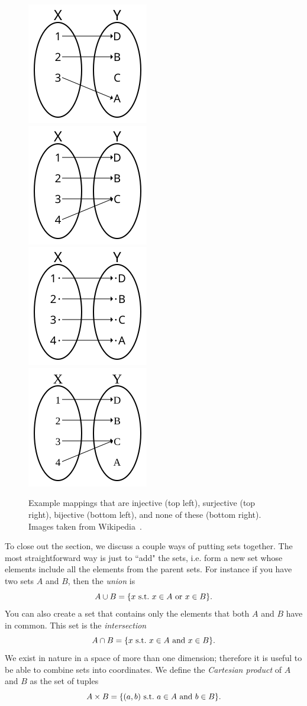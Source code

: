 \begin{figure}
\centering
\includegraphics[width=0.25\linewidth]{figs/Injection.png}~~~
\includegraphics[width=0.25\linewidth]{figs/Surjection.png}\\
\includegraphics[width=0.25\linewidth]{figs/Bijection.png}~~~
\includegraphics[width=0.25\linewidth]{figs/Not-Injection-Surjection.png}
\caption{Example mappings that are injective (top left), surjective (top right),
bijective (bottom left), and none of these (bottom right). Images taken from
Wikipedia~\cite{wiki:bijection}.}
\label{fig:mapping}
\end{figure}


To close out the section, we discuss a couple ways of putting sets together.
The most straightforward way is just to ``add" the sets, i.e. form a new set
whose elements include all the elements from the parent sets. For instance if
you have two sets $A$ and $B$, then the {\it union} is
\begin{equation}
A\cup B = \{x~\text{s.t.}~ x\in A~\text{or}~x\in B\}.
\end{equation}
You can also create a set that contains only the elements that both $A$ and $B$ have
in common. This set is the {\it intersection}
\begin{equation}
A\cap B = \{x~\text{s.t.}~ x\in A~\text{and}~x\in B\}.
\end{equation}
We exist in nature in a space of more than one dimension; therefore it is useful to be
able to combine sets into coordinates. We define the
{\it Cartesian product} of $A$ and $B$ as the set of tuples
\begin{equation}
A\times B=\{(a,b)~\text{s.t.}~ a\in A~\text{and}~b\in B\}.
\end{equation}


